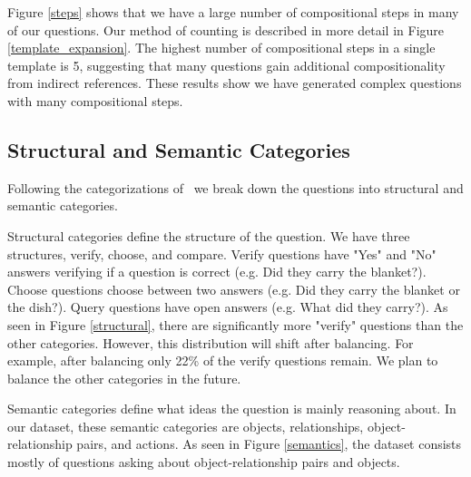 \documentclass[10pt,twocolumn,letterpaper]{article}
\newcommand{\mgm}[1]{{\color{cyan}{mgm: #1}}}
\begin{document}
Figure \ref{steps} shows that we have a large number of compositional steps in many of our questions. Our method of counting is described in more detail in Figure \ref{template_expansion}. The highest number of compositional steps in a single template is 5, suggesting that many questions gain additional compositionality from indirect references. These results show we have generated complex questions with many compositional steps. 


\mgm{Add this information, in a condensed form, to the end of the dataset generation section I think}

\subsection{Structural and Semantic Categories}

Following the categorizations of~\cite{hudson2019gqa} we break down the questions into structural and semantic categories. 

Structural categories define the structure of the question. We have three structures, verify, choose, and compare. \mgm{add in new ones} Verify questions have "Yes" and "No" answers verifying if a question is correct (e.g. Did they carry the blanket?). Choose questions choose between two answers (e.g. Did they carry the blanket or the dish?). Query questions have open answers (e.g. What did they carry?). As seen in Figure \ref{structural}, there are significantly more "verify" questions than the other categories. However, this distribution will shift after balancing. For example, after balancing only 22\% of the verify questions remain. We plan to balance the other categories in the future.

Semantic categories define what ideas the question is mainly reasoning about. In our dataset, these semantic categories are objects, relationships, object-relationship pairs, and actions. As seen in Figure \ref{semantics}, the dataset consists mostly of questions asking about object-relationship pairs and objects. 

\mgm{bring structural/semantic category stuff to when describing global attributes for experiments and results}
\end{document}
